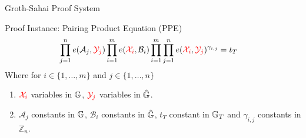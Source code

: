 
\begin{frame}{Groth-Sahai Proof System}
  \begin{block}{Proof Instance: Pairing Product Equation (PPE)}
    \begin{align*}
      \prod^{n}_{j=1} e(\mathcal{A}_j, {\color{red}\mathcal{Y}_j}) \prod^{m}_{i=1}e({\color{red}\mathcal{X}_i}, \mathcal{B}_i)\prod^{m}_{i=1} \prod^{n}_{j=1}e({\color{red}\mathcal{X}_i}, {\color{red}\mathcal{Y}_j})^{\gamma_{i,j}} &= t_T
    \end{align*}
    Where for $i \in \{1, \dots, m\}$ and $j \in \{1, \dots, n\}$
    \begin{enumerate}
    \item ${\color{red}\mathcal{X}_i}$ variables in $\mathbb{G}$, ${\color{red}\mathcal{Y}_j}$ variables in $\hat{\mathbb{G}}$.
    \item $\mathcal{A}_j$ constants in $\mathbb{G}$, $\mathcal{B}_i$ constants in $\hat{\mathbb{G}}$, $t_T$ constant in $\mathbb{G}_T$ and $\gamma_{i,j}$ constants in $\mathbb{Z}_n$.
    \end{enumerate}
  \end{block}
  
\end{frame}

